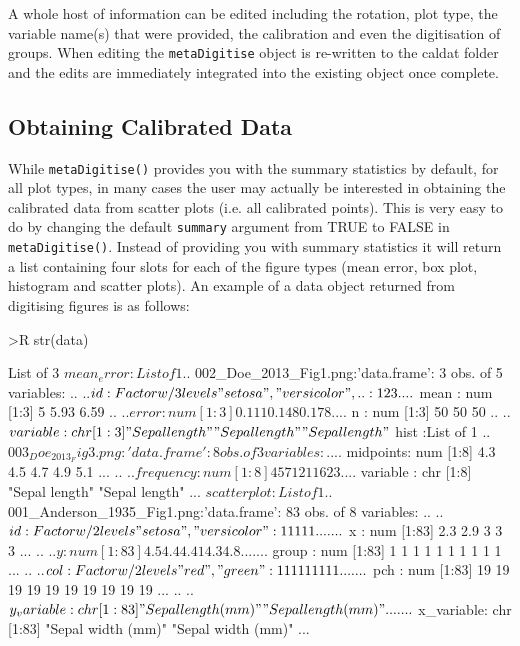 \documentclass[12pt]{article}
\newcommand{\code}[1]{\texttt{#1}}
\newcommand{\fct}[1]{\texttt{#1()}}
\begin{document}
A whole host of information can be edited including the rotation, plot type, the variable name(s) that were provided, the calibration and even the digitisation of groups. When editing the \code{metaDigitise} object is re-written to the caldat folder and the edits are immediately integrated into the existing object once complete. 

\subsection{Obtaining Calibrated Data}

While \fct{metaDigitise} provides you with the summary statistics by default, for all plot types, in many cases the user may actually be interested in obtaining the calibrated data from scatter plots (i.e. all calibrated points). This is very easy to do by changing the default \code{summary} argument from TRUE to FALSE in \fct{metaDigitise}. Instead of providing you with summary statistics it will return a list containing four slots for each of the figure types (mean error, box plot, histogram and scatter plots). An example of a data object returned from digitising figures is as follows:

\begin{CodeChunk}

\begin{CodeInput}
>R str(data)
\end{CodeInput}

\begin{CodeOutput}
List of 3
 $ mean_error :List of 1
  ..$ 002_Doe_2013_Fig1.png:'data.frame': 3 obs. of  5 variables:
  .. ..$ id      : Factor w/ 3 levels "setosa","versicolor",..: 1 2 3
  .. ..$ mean    : num [1:3] 5 5.93 6.59
  .. ..$ error   : num [1:3] 0.111 0.148 0.178
  .. ..$ n       : num [1:3] 50 50 50
  .. ..$ variable: chr [1:3] "Sepal length" "Sepal length" "Sepal length"
 $ hist       :List of 1
  ..$ 003_Doe_2013_Fig3.png:'data.frame': 8 obs. of  3 variables:
  .. ..$ midpoints: num [1:8] 4.3 4.5 4.7 4.9 5.1 ...
  .. ..$ frequency: num [1:8] 4 5 7 12 11 6 2 3
  .. ..$ variable : chr [1:8] "Sepal length" "Sepal length" ...
 $ scatterplot:List of 1
  ..$ 001_Anderson_1935_Fig1.png:'data.frame':  83 obs. of  8 variables:
  .. ..$ id        : Factor w/ 2 levels "setosa","versicolor": 1 1 1 1 1 ...
  .. ..$ x         : num [1:83] 2.3 2.9 3 3 3 ...
  .. ..$ y         : num [1:83] 4.5 4.4 4.41 4.3 4.8 ...
  .. ..$ group     : num [1:83] 1 1 1 1 1 1 1 1 1 1 ...
  .. ..$ col       : Factor w/ 2 levels "red","green": 1 1 1 1 1 1 1 1 1 ...
  .. ..$ pch       : num [1:83] 19 19 19 19 19 19 19 19 19 19 ...
  .. ..$ y_variable: chr [1:83] "Sepal length (mm)" "Sepal length (mm)"  ...
  .. ..$ x_variable: chr [1:83] "Sepal width (mm)" "Sepal width (mm)"    ...
\end{CodeOutput}
\end{CodeChunk}
\end{document}
